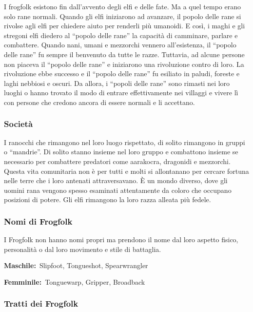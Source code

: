 I frogfolk esistono fin dall'avvento degli elfi e delle fate. Ma a quel
tempo erano solo rane normali. Quando gli elfi iniziarono ad avanzare,
il popolo delle rane si rivolse agli elfi per chiedere aiuto per
renderli più umanoidi. E così, i maghi e gli stregoni elfi diedero al
``popolo delle rane'' la capacità di camminare, parlare e combattere.
Quando nani, umani e mezzorchi vennero all'esistenza, il ``popolo delle
rane'' fu sempre il benvenuto da tutte le razze. Tuttavia, ad alcune
persone non piaceva il ``popolo delle rane'' e iniziarono una
rivoluzione contro di loro. La rivoluzione ebbe successo e il ``popolo
delle rane'' fu esiliato in paludi, foreste e laghi nebbiosi e oscuri.
Da allora, i ``popoli delle rane'' sono rimasti nei loro luoghi o hanno
trovato il modo di entrare effettivamente nei villaggi e vivere lì con
persone che credono ancora di essere normali e li accettano.

\subsubsection{\texorpdfstring{\textbf{Società}}{Società}}\label{societuxe0}

I ranocchi che rimangono nel loro luogo rispettato, di solito rimangono
in gruppi o ``mandrie''. Di solito stanno insieme nel loro gruppo e
combattono insieme se necessario per combattere predatori come
aarakocra, dragonidi e mezzorchi. Questa vita comunitaria non è per
tutti e molti si allontanano per cercare fortuna nelle terre che i loro
antenati attraversavano. È un mondo diverso, dove gli uomini rana
vengono spesso esaminati attentamente da coloro che occupano posizioni
di potere. Gli elfi rimangono la loro razza alleata più fedele.

\subsubsection{\texorpdfstring{Nomi di
\textbf{Frogfolk}}{Nomi di Frogfolk}}\label{nomi-di-frogfolk}

I Frogfolk non hanno nomi propri ma prendono il nome dal loro aspetto
fisico, personalità o dal loro movimento e stile di battaglia.

\textbf{Maschile:}~Slipfoot, Tongueshot, Spearwrangler

\textbf{Femminile:}~Tonguewarp, Gripper, Broadback

\subsubsection{\texorpdfstring{Tratti dei
\textbf{Frogfolk}}{Tratti dei Frogfolk}}\label{tratti-dei-frogfolk}

